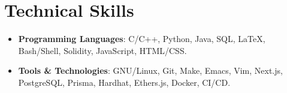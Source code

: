 \documentclass[letterpaper, 11pt]{article}
\newcommand{\techSkillItem}[2] {\item\small{\textbf{#1}{#2 \vspace{-2pt}}}}
\begin{document}
\section{Technical Skills}
\begin{itemize}[leftmargin=*]
  \techSkillItem{Programming Languages}{: C/C++, Python, Java, SQL, \LaTeX{}, Bash/Shell, Solidity, JavaScript, HTML/CSS.}
  \techSkillItem{Tools \& Technologies}{: GNU/Linux, Git, Make, Emacs, Vim, Next.js, PostgreSQL, Prisma, Hardhat, Ethers.js, Docker, CI/CD.}
\end{itemize}
\end{document}
